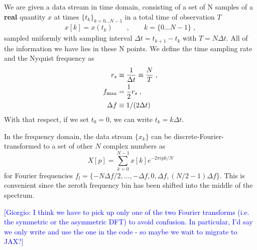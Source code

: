 \documentclass[%
 reprint,
superscriptaddress,
nofootinbib,
 amsmath,amssymb,
 aps,
colorlinks = true, 
linkcolor = blue, 
urlcolor = blue, 
citecolor = blue, 
anchorcolor = blue,
]{revtex4-2}
\newcommand{\ls}[1]{\textcolor{purple}{[Lorenzo: #1]}}
\begin{document}
We are given a data stream in time domain, consisting of a set of N samples of a \textbf{real} quantity $x$ at times $\{t_k\}_{k=0\dots N-1}$ in a total time of observation $T$
\begin{align}\label{st_definition}
x[k]=x(t_k)\qquad,\qquad k=\{0\dots N-1\}\;,
\end{align}
sampled uniformly with sampling interval $\Delta t = t_{k+1} - t_{k}$ with $T = N\Delta t$. All of the information we have lies in these N points. We define the time sampling rate and the Nyquist frequency as
\begin{align}
r_s&\equiv\frac{1}{\Delta t}\equiv\frac{N}{T}\;,\nonumber\\
f_{\rm max}&=\frac 1 2r_s\;,\nonumber\\
\Delta f &\equiv 1/(2\Delta t)
\end{align}
With that respect, if we set $t_0=0$, we can write $t_k=k\Delta t$. 

In the frequency domain, the data stream $\{x_k\}$ can be discrete-Fourier-transformed to a set of other $N$ complex numbers as
%
\begin{equation}
\label{eq:dft-definition}
X[p] = \sum_{k = 0}^{N-1} x[k]e^{-2\pi i p k/N} %
\end{equation}
%
for Fourier frequencies $f_{l} = \{-N\Delta f/2, \ldots, -\Delta f, 0, \Delta f, (N/2 - 1)\Delta f\}$. This is convenient since the zeroth frequency bin has been shifted into the middle of the spectrum.

\textcolor{blue}{[Giorgio: I think we have to pick up only one of the two Fourier transforms (i.e. the symmetric or the asymmetric DFT) to avoid confusion. In particular, I'd say we only write and use the one in the code - so maybe we wait to migrate to JAX?]}
\end{document}
